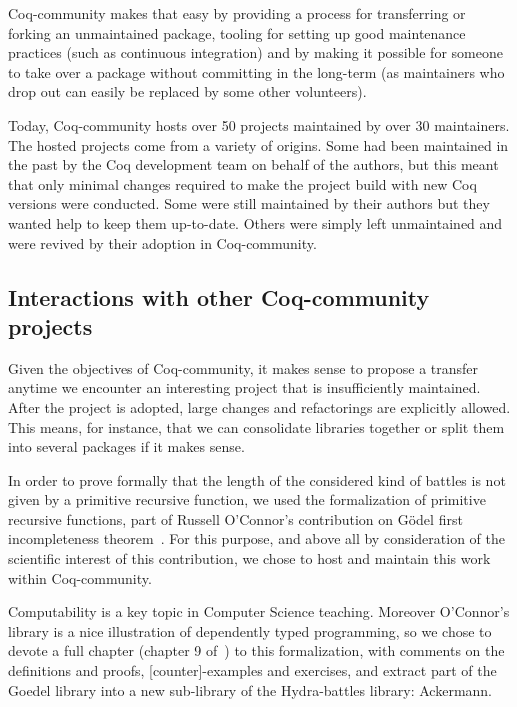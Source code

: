 \documentclass{easychair}
\newcommand{\coq}{Coq\xspace}
\newcommand{\community}{Coq-community\xspace}
\begin{document}
\community makes that easy by providing a process for transferring or forking an unmaintained package, tooling for setting up good maintenance practices (such as continuous integration) and by making it possible for someone to take over a package without committing in the long-term (as maintainers who drop out can easily be replaced by some other volunteers).

Today, \community hosts over 50 projects maintained by over 30 maintainers.
%
The hosted projects come from a variety of origins.
%
Some had been maintained in the past by the \coq development team on behalf of the authors, but this meant that only minimal changes required to make the project build with new \coq versions were conducted.
%
Some were still maintained by their authors but they wanted help to keep them up-to-date.
%
Others were simply left unmaintained and were revived by their adoption in \community.

\subsection{Interactions with other \community projects}

Given the objectives of \community, it makes sense to propose a transfer anytime we encounter an interesting project that is insufficiently maintained.
%
After the project is adopted, large changes and refactorings are explicitly allowed.
%
This means, for instance, that we can consolidate libraries together or split them into several packages if it makes sense.

In order to prove formally that the length of the considered
kind of battles is not given by a primitive recursive function, we used the formalization of primitive recursive functions, part
of Russell O'Connor's contribution on G\"{o}del first incompleteness theorem~\cite{OConnor05, Goedel}.
For this purpose, and above all by consideration of the scientific interest of this contribution, we chose to host and maintain this work within \community.

Computability is a key topic in Computer Science teaching. Moreover O'Connor's library is a nice illustration of dependently typed programming, so we chose to devote a full chapter (chapter 9 of~\cite{HydraBook}) to this formalization, with comments on the definitions and proofs, [counter]-examples and exercises, and  extract part of the Goedel library into a new sub-library of the Hydra-battles library: Ackermann.

\end{document}
